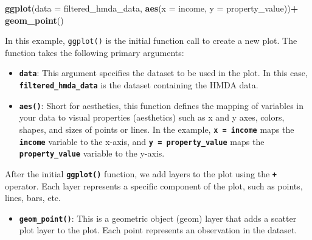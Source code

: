 \documentclass[
]{book}
\newenvironment{Shaded}{\begin{snugshade}}{\end{snugshade}}
\newcommand{\AttributeTok}[1]{\textcolor[rgb]{0.13,0.29,0.53}{#1}}
\newcommand{\FunctionTok}[1]{\textcolor[rgb]{0.13,0.29,0.53}{\textbf{#1}}}
\newcommand{\NormalTok}[1]{#1}
\newcommand{\SpecialCharTok}[1]{\textcolor[rgb]{0.81,0.36,0.00}{\textbf{#1}}}
\providecommand{\tightlist}{%
  \setlength{\itemsep}{0pt}\setlength{\parskip}{0pt}}
\begin{document}
\begin{Shaded}
\begin{Highlighting}[]
\FunctionTok{ggplot}\NormalTok{(}\AttributeTok{data =}\NormalTok{ filtered\_hmda\_data, }\FunctionTok{aes}\NormalTok{(}\AttributeTok{x =}\NormalTok{ income, }\AttributeTok{y =}\NormalTok{ property\_value))}\SpecialCharTok{+}
  \FunctionTok{geom\_point}\NormalTok{()}
\end{Highlighting}
\end{Shaded}

In this example, \texttt{ggplot()} is the initial function call to create a new plot. The function takes the following primary arguments:

\begin{itemize}
\tightlist
\item
  \textbf{\texttt{data}}: This argument specifies the dataset to be used in the plot. In this case, \textbf{\texttt{filtered\_hmda\_data}} is the dataset containing the HMDA data.
\item
  \textbf{\texttt{aes()}}: Short for aesthetics, this function defines the mapping of variables in your data to visual properties (aesthetics) such as x and y axes, colors, shapes, and sizes of points or lines. In the example, \textbf{\texttt{x\ =\ income}} maps the \textbf{\texttt{income}} variable to the x-axis, and \textbf{\texttt{y\ =\ property\_value}} maps the \textbf{\texttt{property\_value}} variable to the y-axis.
\end{itemize}

After the initial \textbf{\texttt{ggplot()}} function, we add layers to the plot using the \textbf{\texttt{+}} operator. Each layer represents a specific component of the plot, such as points, lines, bars, etc.

\begin{itemize}
\tightlist
\item
  \textbf{\texttt{geom\_point()}}: This is a geometric object (geom) layer that adds a scatter plot layer to the plot. Each point represents an observation in the dataset.
\end{itemize}

  
\end{document}
